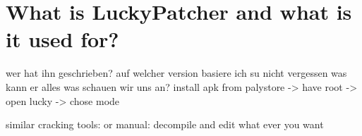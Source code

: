\section{What is LuckyPatcher and what is it used for?}\label{section:luckypatcher-explain}
wer hat ihn geschrieben?\newline
auf welcher version basiere ich\newline
su nicht vergessen\newline
was kann er alles\newline
was schauen wir uns an?\newline
install apk from palystore -> have root -> open lucky -> chose mode

similar cracking tools:\newline
or manual: decompile and edit what ever you want \newline
